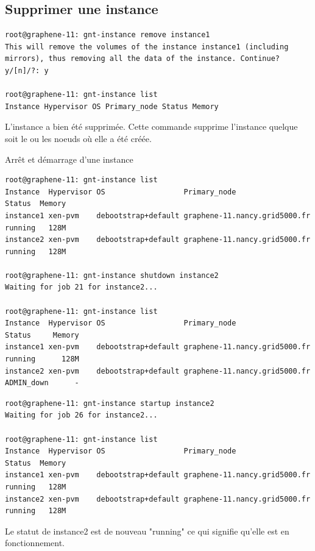 \subsection {Supprimer une instance}
\begin{lstlisting}
root@graphene-11: gnt-instance remove instance1
This will remove the volumes of the instance instance1 (including
mirrors), thus removing all the data of the instance. Continue?
y/[n]/?: y

root@graphene-11: gnt-instance list
Instance Hypervisor OS Primary_node Status Memory
\end{lstlisting}
L'instance a bien été supprimée. Cette commande supprime l'instance quelque soit le ou les noeuds où elle a été créée.


Arrêt et démarrage d'une instance
\begin{lstlisting}
root@graphene-11: gnt-instance list
Instance  Hypervisor OS                  Primary_node                  Status  Memory
instance1 xen-pvm    debootstrap+default graphene-11.nancy.grid5000.fr running   128M
instance2 xen-pvm    debootstrap+default graphene-11.nancy.grid5000.fr running   128M

root@graphene-11: gnt-instance shutdown instance2
Waiting for job 21 for instance2...

root@graphene-11: gnt-instance list
Instance  Hypervisor OS                  Primary_node                  Status     Memory
instance1 xen-pvm    debootstrap+default graphene-11.nancy.grid5000.fr running      128M
instance2 xen-pvm    debootstrap+default graphene-11.nancy.grid5000.fr ADMIN_down      -
\end{lstlisting}


\begin{lstlisting}
root@graphene-11: gnt-instance startup instance2
Waiting for job 26 for instance2...

root@graphene-11: gnt-instance list
Instance  Hypervisor OS                  Primary_node                  Status  Memory
instance1 xen-pvm    debootstrap+default graphene-11.nancy.grid5000.fr running   128M
instance2 xen-pvm    debootstrap+default graphene-11.nancy.grid5000.fr running   128M
\end{lstlisting}
Le statut de instance2 est de nouveau "running" ce qui signifie qu'elle est en fonctionnement.

